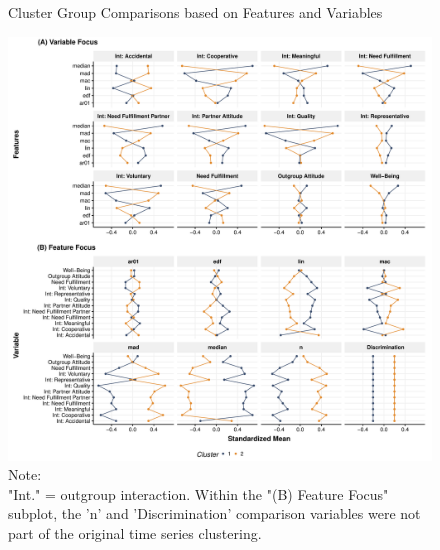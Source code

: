 \documentclass[man, 12pt, a4paper, floatsintext]{apa7}
\theoremstyle{break}
\theoremstyle{plain}
\begin{document}
\begin{figure}[!ht] %
  \caption{Cluster Group Comparisons based on Features and Variables}
  \label{fig:clusterFeatVar}
  \centering\includegraphics[width=\textwidth]{figures/clusterFeatVarComb.pdf}
  \caption*{Note: \\
  "Int." = outgroup interaction. Within the "(B) Feature Focus" subplot, the 'n' and 'Discrimination' comparison variables were not part of the original time series clustering.}
\end{figure}
\end{document}
